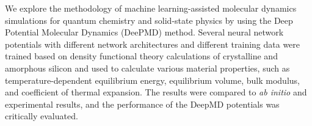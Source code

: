 We explore the methodology of machine learning-assisted molecular dynamics
simulations for quantum chemistry and solid-state physics by using the Deep
Potential Molecular Dynamics (DeePMD) method. Several neural network
potentials with different network architectures and different training data
were trained based on density functional theory calculations of crystalline
and amorphous silicon and used to calculate various material properties, such
as temperature-dependent equilibrium energy, equilibrium volume, bulk modulus,
and coefficient of thermal expansion. The results were compared to
\textit{ab initio} and experimental results, and the performance of the DeepMD
potentials was critically evaluated.
